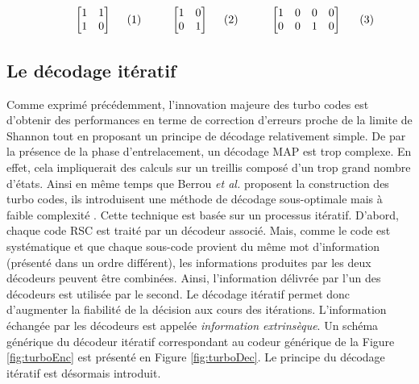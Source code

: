 \begin{subequations}\label{eq:mat}
	\begin{minipage}{0.25\textwidth}
		\begin{align}
			\label{eq:mat1a}
			\begin{bmatrix}
			1 & 1 \\
			1 & 0 
			\end{bmatrix}
		\end{align}
	\end{minipage}
	\begin{minipage}{0.25\textwidth}
		\begin{align}
			\label{eq:mat1b}
			\begin{bmatrix}
			1 & 0 \\
			0 & 1 
			\end{bmatrix}
		\end{align}
	\end{minipage}
	\begin{minipage}{0.35\textwidth}
		\begin{align}
			\label{eq:mat1c}
			\begin{bmatrix}
			1 & 0 & 0 & 0 \\
			0 & 0 & 1 & 0 
			\end{bmatrix}
		\end{align}
	\end{minipage}
\end{subequations}

\subsection{Le décodage itératif}
Comme exprimé précédemment, l'innovation majeure des turbo codes est d'obtenir des performances en terme de correction 
d'erreurs proche de la limite de Shannon tout en proposant un principe de décodage relativement simple. De par la présence 
de la phase d'entrelacement, un décodage MAP est trop complexe. En effet, cela impliquerait des calculs sur un treillis 
composé d'un trop grand nombre d'états. Ainsi en même temps que Berrou \textit{et al.} proposent la construction des turbo 
codes, ils introduisent une méthode de décodage sous-optimale mais à faible complexité \cite{berrouTC}. Cette technique est 
basée sur un processus itératif. D'abord, chaque code RSC est traité par un décodeur associé. Mais, comme le code est systématique 
et que chaque sous-code provient du même mot d'information (présenté dans un ordre différent), les informations produites 
par les deux décodeurs peuvent être combinées. Ainsi, l'information délivrée par l'un des décodeurs est utilisée par le 
second. Le décodage itératif permet donc d'augmenter la fiabilité de la décision aux cours des itérations. L'information 
échangée par les décodeurs est appelée \emph{information extrinsèque}. Un schéma générique du décodeur itératif correspondant 
au codeur générique de la Figure \ref{fig:turboEnc} est présenté en Figure \ref{fig:turboDec}. Le principe du décodage itératif 
est désormais introduit.

